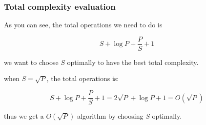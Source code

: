 \begin{frame}
\frametitle{Total complexity evaluation}
As you can see, the total operations we need to do is 

\[S + \log P + \frac{P}{S} + 1\]

we want to choose $S$ optimally to have the best total complexity.

\bigskip
when $S = \sqrt{P}$, the total operations is:

\[S + \log P + \frac{P}{S} + 1 = 2\sqrt{P} + \log P + 1 = O(\sqrt{P})\]

thus we get a $O(\sqrt{P})$ algorithm by choosing $S$ optimally.
\end{frame}
